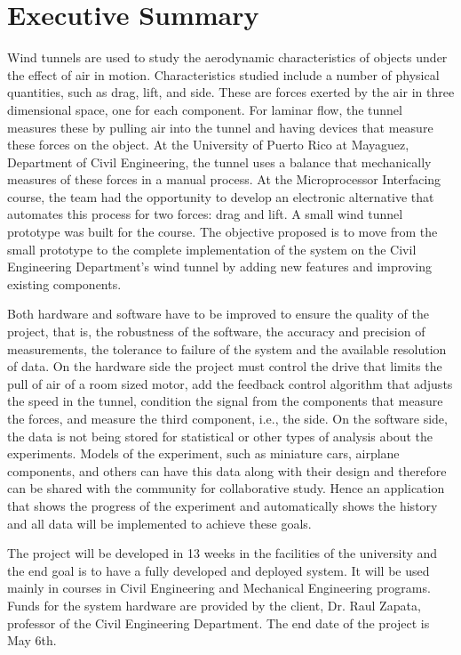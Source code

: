 \section{Executive Summary}
	Wind tunnels are used to study the aerodynamic characteristics of objects under the effect of air in motion. Characteristics  studied include a number of physical quantities, such as drag, lift, and side. These are forces exerted by the air in three dimensional space, one for each component. For laminar flow, the tunnel measures these by pulling air into the tunnel and having  devices that measure these forces on the object. At the University of Puerto Rico at Mayaguez, Department of Civil Engineering, the tunnel uses a balance that mechanically measures of these forces in a manual process. At the Microprocessor Interfacing course, the team had the opportunity to develop an electronic alternative that automates this process for two forces: drag and lift. A small wind tunnel prototype was built for the course. The objective proposed is to move from the small prototype to the complete implementation of the system on the Civil Engineering Department's wind tunnel by adding new features and improving existing components.
	
	Both hardware and software have to be improved to ensure the quality of the project, that is, the robustness of the software, the accuracy and precision of measurements, the tolerance to failure of the system and the available resolution of data. On the hardware side the project must control the drive that limits the pull of air of a room sized motor, add the feedback control algorithm that adjusts the speed in the tunnel, condition the signal from the components that measure the forces, and measure the third component, i.e., the side. On the software side, the data is not being stored for statistical or other types of analysis about the experiments. Models of the experiment, such as miniature cars, airplane components, and others can have this data along with their design and therefore can be shared with the community for collaborative study. Hence an application that shows the progress of the experiment and automatically shows the history and all data will be implemented to achieve these goals. 

	The project will be developed in 13 weeks in the facilities of the university and the end goal is to have a fully developed and deployed system. It will be used mainly in courses in Civil Engineering and Mechanical Engineering programs. Funds for the system hardware are provided by the client, Dr. Raul Zapata, professor of the Civil Engineering Department. The end date of the project is May 6th.